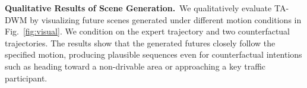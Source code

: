 \noindent\textbf{Qualitative Results of Scene Generation.}~We qualitatively evaluate TA-DWM by visualizing future scenes generated under different motion conditions in Fig.~\ref{fig:visual}. We condition on the expert trajectory and two counterfactual trajectories. The results show that the generated futures closely follow the specified motion, producing plausible sequences even for counterfactual intentions such as heading toward a non-drivable area or approaching a key traffic participant.







